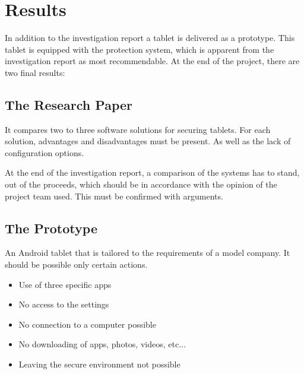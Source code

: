 \section*{Results}
In addition to the investigation report a tablet is delivered as a prototype. This tablet is equipped with the protection system, which is apparent from the investigation report as most recommendable.
\newline At the end of the project, there are two final results:
\subsection*{The Research Paper}
It compares two to three software solutions for securing tablets. For each solution, advantages and disadvantages must be present. As well as the lack of configuration options.

At the end of the investigation report, a comparison of the systems has to stand, out of the proceeds, which should be in accordance with the opinion of the project team used. This must be confirmed with arguments.
\newpage
\subsection*{The Prototype}
An Android tablet that is tailored to the requirements of a model company. It should be possible only certain actions.
\begin{itemize}
	\item Use of three specific apps
	\item No access to the settings
	\item No connection to a computer possible
	\item No downloading of apps, photos, videos, etc...
	\item Leaving the secure environment not possible
\end{itemize}
